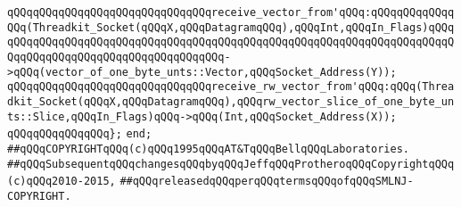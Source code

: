 \verb|qQQqqQQqqQQqqQQqqQQqqQQqqQQqqQQqreceive_vector_from'qQQq:qQQqqQQqqQQqqQQq(Threadkit_Socket(qQQqX,qQQqDatagramqQQq),qQQqInt,qQQqIn_Flags)qQQqqQQqqQQqqQQqqQQqqQQqqQQqqQQqqQQqqQQqqQQqqQQqqQQqqQQqqQQqqQQqqQQqqQQqqQQqqQQqqQQqqQQqqQQqqQQqqQQqqQQqqQQq->qQQq(vector_of_one_byte_unts::Vector,qQQqSocket_Address(Y));|\newline
\verb|qQQqqQQqqQQqqQQqqQQqqQQqqQQqqQQqreceive_rw_vector_from'qQQq:qQQq(Threadkit_Socket(qQQqX,qQQqDatagramqQQq),qQQqrw_vector_slice_of_one_byte_unts::Slice,qQQqIn_Flags)qQQq->qQQq(Int,qQQqSocket_Address(X));|\newline
\verb|qQQqqQQqqQQqqQQq};|\newline
\newline
\newline
\verb|end;|\newline
\newline
\newline
\verb|##qQQqCOPYRIGHTqQQq(c)qQQq1995qQQqAT&TqQQqBellqQQqLaboratories.|\newline
\verb|##qQQqSubsequentqQQqchangesqQQqbyqQQqJeffqQQqProtheroqQQqCopyrightqQQq(c)qQQq2010-2015,|\newline
\verb|##qQQqreleasedqQQqperqQQqtermsqQQqofqQQqSMLNJ-COPYRIGHT.|\newline

